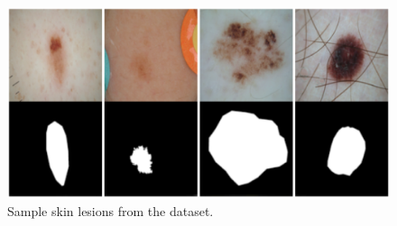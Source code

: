 \begin{figure}
    \centerline{\includegraphics[width=1\columnwidth]{04-methodology/figures/sample-images-from-dataset.png}}
    \caption{Sample skin lesions from the dataset.}
    \label{figure:sample-images-from-dataset}
\end{figure}